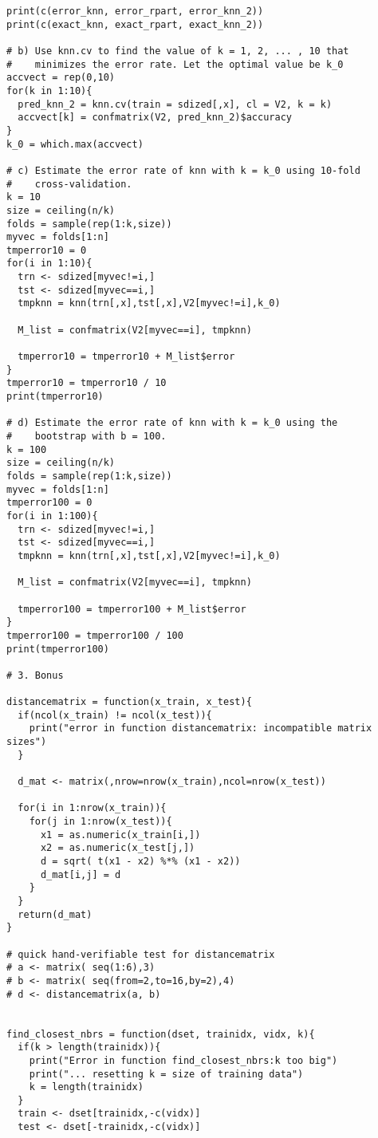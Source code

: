\documentclass[11pt]{article}
\begin{document}
\begin{Verbatim}
print(c(error_knn, error_rpart, error_knn_2))
print(c(exact_knn, exact_rpart, exact_knn_2))

# b) Use knn.cv to find the value of k = 1, 2, ... , 10 that 
#    minimizes the error rate. Let the optimal value be k_0
accvect = rep(0,10)
for(k in 1:10){
  pred_knn_2 = knn.cv(train = sdized[,x], cl = V2, k = k)
  accvect[k] = confmatrix(V2, pred_knn_2)$accuracy
}
k_0 = which.max(accvect)

# c) Estimate the error rate of knn with k = k_0 using 10-fold
#    cross-validation.
k = 10
size = ceiling(n/k)
folds = sample(rep(1:k,size))
myvec = folds[1:n]
tmperror10 = 0
for(i in 1:10){
  trn <- sdized[myvec!=i,]
  tst <- sdized[myvec==i,]
  tmpknn = knn(trn[,x],tst[,x],V2[myvec!=i],k_0)

  M_list = confmatrix(V2[myvec==i], tmpknn)

  tmperror10 = tmperror10 + M_list$error
}
tmperror10 = tmperror10 / 10
print(tmperror10)

# d) Estimate the error rate of knn with k = k_0 using the 
#    bootstrap with b = 100.
k = 100
size = ceiling(n/k)
folds = sample(rep(1:k,size))
myvec = folds[1:n]
tmperror100 = 0
for(i in 1:100){
  trn <- sdized[myvec!=i,]
  tst <- sdized[myvec==i,]
  tmpknn = knn(trn[,x],tst[,x],V2[myvec!=i],k_0)

  M_list = confmatrix(V2[myvec==i], tmpknn)

  tmperror100 = tmperror100 + M_list$error
}
tmperror100 = tmperror100 / 100
print(tmperror100)

# 3. Bonus

distancematrix = function(x_train, x_test){
  if(ncol(x_train) != ncol(x_test)){
    print("error in function distancematrix: incompatible matrix sizes")
  }

  d_mat <- matrix(,nrow=nrow(x_train),ncol=nrow(x_test))

  for(i in 1:nrow(x_train)){
    for(j in 1:nrow(x_test)){
      x1 = as.numeric(x_train[i,])
      x2 = as.numeric(x_test[j,])
      d = sqrt( t(x1 - x2) %*% (x1 - x2))
      d_mat[i,j] = d
    }
  }
  return(d_mat)
}

# quick hand-verifiable test for distancematrix
# a <- matrix( seq(1:6),3)
# b <- matrix( seq(from=2,to=16,by=2),4)
# d <- distancematrix(a, b)


find_closest_nbrs = function(dset, trainidx, vidx, k){
  if(k > length(trainidx)){
    print("Error in function find_closest_nbrs:k too big")
    print("... resetting k = size of training data")
    k = length(trainidx)
  }
  train <- dset[trainidx,-c(vidx)]
  test <- dset[-trainidx,-c(vidx)]


\end{Verbatim}
\end{document}
